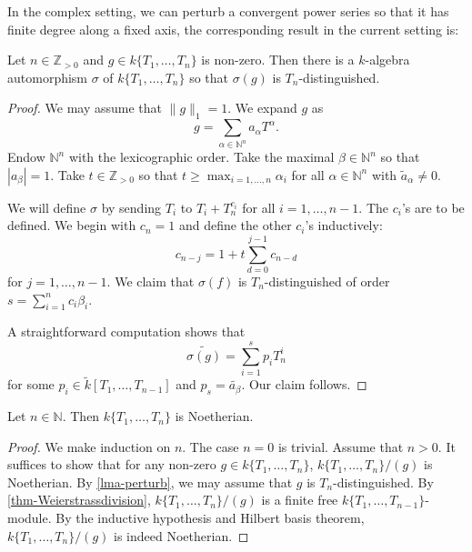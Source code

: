 In the complex setting, we can perturb a convergent power series so that it has finite degree along a fixed axis, the corresponding result in the current setting is:
\begin{lemma}\label{lma-perturb}
    Let $n\in \mathbb{Z}_{>0}$ and $g\in k\{T_1,\ldots,T_{n}\}$ is non-zero. Then there is a $k$-algebra automorphism $\sigma$ of $k\{T_1,\ldots,T_{n}\}$ so that $\sigma(g)$ is $T_n$-distinguished.
\end{lemma}

\begin{proof}
    We may assume that $\|g\|_1=1$. We expand $g$ as
    \[
        g=\sum_{\alpha\in \mathbb{N}^n} a_{\alpha}T^{\alpha}.
    \]
    Endow $\mathbb{N}^n$ with the lexicographic order. Take the maximal $\beta\in \mathbb{N}^n$ so that $|a_{\beta}|=1$. Take $t\in \mathbb{Z}_{>0}$ so that $t\geq \max_{i=1,\ldots,n} \alpha_i$ for all $\alpha\in \mathbb{N}^n$ with $\tilde{a}_{\alpha}\neq 0$.

    We will define $\sigma$ by sending $T_i$ to $T_i+T_n^{c_i}$ for all $i=1,\ldots,n-1$. The $c_i$'s are to be defined. We begin with $c_n=1$ and define the other $c_i$'s inductively:
    \[
        c_{n-j}=1+t\sum_{d=0}^{j-1}c_{n-d}  
    \]
    for $j=1,\ldots,n-1$. We claim that $\sigma(f)$ is $T_n$-distinguished of order $s=\sum_{i=1}^n c_i \beta_i$.

    A straightforward computation shows that 
    \[
        \widetilde{\sigma(g)}=\sum_{i=1}^s p_i T_n^i  
    \]
    for some $p_i\in \tilde{k}[T_1,\ldots,T_{n-1}]$ and $p_s=\tilde{a_{\beta}}$. Our claim follows.
\end{proof}



\begin{proposition}\label{prop-strictnoetherian}
    Let $n\in \mathbb{N}$. Then $k\{T_1,\ldots,T_n\}$ is Noetherian.
\end{proposition}
\begin{proof}
    We make induction on $n$. The case $n=0$ is trivial. Assume that $n>0$. It suffices to show that for any non-zero $g\in k\{T_1,\ldots,T_n\}$, $k\{T_1,\ldots,T_n\}/(g)$ is Noetherian. By \cref{lma-perturb}, we may assume that $g$ is $T_n$-distinguished. By \cref{thm-Weierstrassdivision}, $k\{T_1,\ldots,T_n\}/(g)$ is a finite free $k\{T_1,\ldots,T_{n-1}\}$-module. By the inductive hypothesis and Hilbert basis theorem, $k\{T_1,\ldots,T_n\}/(g)$ is indeed Noetherian.
\end{proof}

